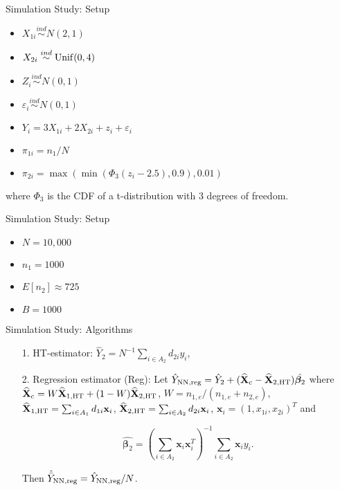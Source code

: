 \documentclass{beamer} %
\renewcommand{\bf}[1]{\mathbf{#1}}
\begin{document}
\begin{frame}{Simulation Study: Setup}

\begin{itemize}
  \item $X_{1i} \stackrel{ind}{\sim} N(2, 1)$
  \item $X_{2i} \stackrel{ind}{\sim} \rm{Unif}(0, 4)$
  \item $Z_{i} \stackrel{ind}{\sim} N(0, 1)$
  \item $\varepsilon_i \stackrel{ind}{\sim} N(0, 1)$
  \item $Y_{i} = 3 X_{1i} + 2 X_{2i} + z_i + \varepsilon_i$
  \item $\pi_{1i} = n_1 / N$
  \item $\pi_{2i} = \max(\min(\Phi_3(z_{i} - 2.5), 0.9), 0.01)$
\end{itemize}

where $\Phi_3$ is the CDF of a t-distribution with 3 degrees of freedom.

\end{frame}

\begin{frame}{Simulation Study: Setup}

  \begin{itemize}
    \item $N = 10,000$
    \item $n_1 = 1000$
    \item $E[n_2] \approx 725$
    \item $B = 1000$
  \end{itemize}

\end{frame}

\begin{frame}{Simulation Study: Algorithms}

\begin{itemize}
  \item[1.] HT-estimator: $\hat Y_{2} = N^{-1} \sum_{i \in A_2} d_{2i} y_i$,
  \item[2.] Regression estimator (Reg): Let $\hat Y_{\rm{NN, reg}} = \hat Y_{2} + (
    \widehat{\bf X}_c - \widehat{\bf X}_{2, \rm{HT}}) \hat{\bm \beta_2}$ where 
    $\widehat{\bf X}_c = W \widehat{\bf X}_{1, \rm{HT}} + 
    (1 - W)\widehat{\bf X}_{2, \rm{HT}}$,
    $W = n_{1, e} / (n_{1, e} + n_{2, e})$,
    $\widehat{\bf X}_{1, \rm{HT}} = \sum_{i \in A_1} d_{1i} \bf x_{i}$, 
    $\widehat{\bf X}_{2, \rm{HT}} = \sum_{i \in A_2} d_{2i} \bf x_{i}$,
    $\bf x_i = (1, x_{1i}, x_{2i})^T$
    and 

    $$ \hat{\bm \beta_2} = \left(\sum_{i \in A_2} \bf x_i \bf x_i^T\right)^{-1}
    \sum_{i \in A_2} \bf x_i y_i.$$

    Then $\hat{\bar Y}_{\rm{NN, reg}} = \hat Y_{\rm{NN, reg}} / N$.
\end{itemize}

\end{frame}
\end{document}
